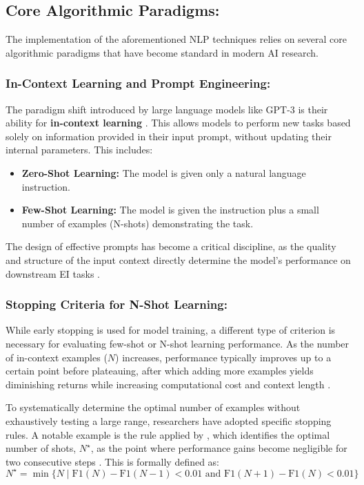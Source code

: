 \subsection{Core Algorithmic Paradigms:} 
The implementation of the aforementioned NLP techniques relies on several core algorithmic paradigms that have become standard in modern AI research.

\subsubsection{In-Context Learning and Prompt Engineering:} 
The paradigm shift introduced by large language models like GPT-3 is their ability for \textbf{in-context learning} \cite{brown2020gpt3}. This allows models to perform new tasks based solely on information provided in their input prompt, without updating their internal parameters. This includes:
\begin{itemize}
    \item \textbf{Zero-Shot Learning:} The model is given only a natural language instruction.
    \item \textbf{Few-Shot Learning:} The model is given the instruction plus a small number of examples (N-shots) demonstrating the task.
\end{itemize}
The design of effective prompts has become a critical discipline, as the quality and structure of the input context directly determine the model's performance on downstream EI tasks \cite{amin2023affective, sabour2024emobench}.

\subsubsection{Stopping Criteria for N-Shot Learning:} 
While early stopping is used for model training, a different type of criterion is necessary for evaluating few-shot or N-shot learning performance. As the number of in-context examples ($N$) increases, performance typically improves up to a certain point before plateauing, after which adding more examples yields diminishing returns while increasing computational cost and context length \cite{brown2020gpt3}.

To systematically determine the optimal number of examples without exhaustively testing a large range, researchers have adopted specific stopping rules. A notable example is the rule applied by \cite{zhu2020stopping} , which identifies the optimal number of shots, $N^{\star}$, as the point where performance gains become negligible for two consecutive steps . This is formally defined as:
\begin{equation}
N^{\star} = \min \{ N \mid \text{F1}(N) - \text{F1}(N-1) < 0.01 \text{ and } \text{F1}(N+1) - \text{F1}(N) < 0.01 \}
\label{eq:stopping_rule}
\end{equation}

